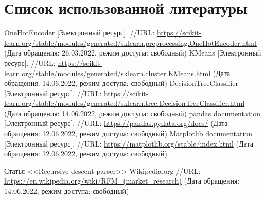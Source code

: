 \documentclass[12pt,a4paper]{article}
\begin{document}
  \section{Список использованной литературы}
  \begin{thebibliography}{3}
     OneHotEncoder [Электронный ресурс]. //URL: \url{https://scikit-learn.org/stable/modules/generated/sklearn.preprocessing.OneHotEncoder.html} (Дата обращения: 26.03.2022, режим доступа: свободный)
     KMeans [Электронный ресурс]. //URL: \url{https://scikit-learn.org/stable/modules/generated/sklearn.cluster.KMeans.html} (Дата обращения: 14.06.2022, режим доступа: свободный)
     DecisionTreeClassifier [Электронный ресурс]. //URL: \url{https://scikit-learn.org/stable/modules/generated/sklearn.tree.DecisionTreeClassifier.html} (Дата обращения: 14.06.2022, режим доступа: свободный)
     pandas documentation [Электронный ресурс]. //URL: \url{https://pandas.pydata.org/docs/} (Дата обращения: 12.06.2022, режим доступа: свободный)
     Matplotlib documentation [Электронный ресурс]. //URL: \url{https://matplotlib.org/stable/index.html} (Дата обращения: 12.06.2022, режим доступа: свободный)

    Статья <<Recursive descent parser>> Wikipedia.org
    //URL: \url{https://en.wikipedia.org/wiki/RFM_(market_research)}
    (Дата обращения: 14.06.2022, режим доступа: свободный)
  \end{thebibliography}
\end{document}

